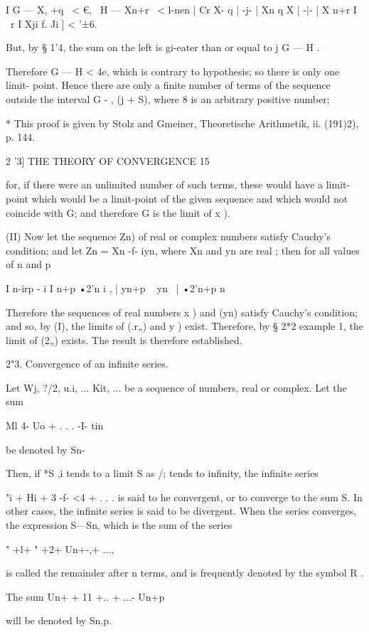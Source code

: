 I G — X, +q \ < €, \ H — Xn+r \ < l-nen | Cr X- q | -j- | Xn q X | -|-
| X n+r I ~r I Xji f. Ji ] < '±6.

But, by § 1'4, the sum on the left is gi-eater than or equal to j G —
H .

Therefore G — H < 4e, which is contrary to hypothesis; so there is
only one limit- point. Hence there are only a finite number of terms
of the sequence outside the interval G - , (j + S), where 8 is an
arbitrary positive number;

* This proof is given by Stolz and Gmeiner, Theoretische Arithmetik,
ii. (191)2), p. 144.



2 '3] THE THEORY OF CONVERGENCE 15

for, if there were an unlimited number of such terms, these would have
a limit-point which would be a limit-point of the given sequence and
which would not coincide with G; and therefore G is the limit of x ).

(II) Now let the sequence Zn) of real or complex numbers satisfy
Cauchy's condition; and let Zn = Xn -f- iyn, where Xn and yn are real
; then for all values of n and p

I n-irp - i I n+p •2'n i , | yn+p ~ yn \ | •2'n+p n\-

Therefore the sequences of real numbers x ) and (yn) satisfy Cauchy's
condition; and so, by (I), the limits of (.r„) and y ) exist.
Therefore, by § 2*2 example 1, the limit of (2„) exists. The result is
therefore established.

2"3. Convergence of an infinite series.

Let Wj, ?/2, u.i, ... Kit, ... be a sequence of numbers, real or
complex. Let the sum

Ml 4- Uo + . . . -I- tin

be denoted by Sn-

Then, if *S ,i tends to a limit S as /; tends to infinity, the
infinite series

"i + Hi + 3 -f- <4 + . . . is said to he convergent, or to converge to
the sum S. In other cases, the infinite series is said to be
divergent. When the series converges, the expression S—Sn, which is
the sum of the series

" +l+ " +2+ Un+-,+ ...,

is called the remainder after n terms, and is frequently denoted by
the symbol R .

The sum Un+ + 11 +.. + ...-\- Un+p

will be denoted by Sn,p.

